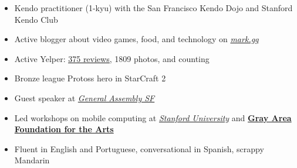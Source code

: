 

\begin{cvparagraph}

\begin{justify}

\begin{itemize}[leftmargin=2ex, nosep]
    \setlength{\parskip}{0pt}
    \setlength\itemsep{0.15em}
    \renewcommand{\labelitemi}{\bullet}
    
\item Kendo practitioner (1-kyu) with the San Francisco Kendo Dojo and Stanford Kendo Club
\item Active blogger about video games, food, and technology on \href{mark.gg}{\textit{mark.gg}}
\item Active Yelper: \href{markcerqueira.yelp.com}{\underline{375 reviews}}, 1809 photos, and counting
\item Bronze league Protoss hero in StarCraft 2
\item Guest speaker at \href{https://generalassemb.ly/instructors/mark-cerqueira/10476}{\textit{General Assembly SF}}
\item Led workshops on mobile computing at \href{https://ccrma.stanford.edu/workshops/music-and-mobile-computing}{\textit{Stanford University}} and \href{http://main.dev.gaffta.org/?author=81}{\textbf{Gray Area Foundation for the Arts}}
\item Fluent in English and Portuguese, conversational in Spanish, scrappy Mandarin

\end{itemize}

\end{justify}

\end{cvparagraph}
